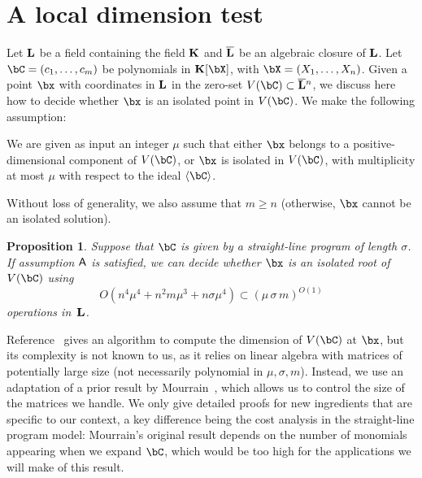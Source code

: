 \documentclass[12pt]{article}
\newtheorem{proposition}[definition]{Proposition}
\begin{document}


\section{A local dimension test} \label{sec:isolated}

Let $\mathbf{L}$ be a field containing the field $\mathbf{K}$ and $\overline{\mathbf{L}}$ be an
algebraic closure of $\mathbf{L}$.  Let $\bC=(c_1,\dots,c_m)$ be polynomials
in $\KK[\bX]$, with $\bX=(X_1,\dots,X_n)$. Given a point $\bx$ with
coordinates in $\mathbf{L}$ in the zero-set $V(\bC)\subset \LLbar{}^n$, we
discuss here how to decide whether $\bx$ is an isolated point in
$V(\bC)$. We make the following assumption:
\begin{description}[leftmargin=*]
\item [$\assH.$] We are given as input an integer $\mu$ such that
 either $\bx$ belongs to a positive-dimensional component of $V(\bC)$,
 or $\bx$ is isolated in $V(\bC)$, with multiplicity at most $\mu$
  with respect to the ideal $\langle \bC\rangle$.
\end{description}
Without loss of generality, we also assume that $m\ge n$ (otherwise, $\bx$
cannot be an isolated solution). 
\begin{proposition}\label{prop:testisolated}
  Suppose that $\bC$ is given by a straight-line program of length $\sigma$.
  If assumption $\mathsf{A}$ is satisfied, we can decide whether $\bx$ is an
  isolated root of $V(\bC)$ using 
$$O(n^4 \mu^4 + n^2 m \mu^3 + n \sigma \mu^4) \subset (\mu\,\sigma\,m)^{O(1)}$$ operations in~$\mathbf{L}$.
\end{proposition}
Reference~\cite{BaHaPeSo09} gives an algorithm to compute the
dimension of $V(\bC)$ at $\bx$, but its complexity is not known to us,
as it relies on linear algebra with matrices of potentially large size
(not necessarily polynomial in $\mu,\sigma,m$).  Instead, we use an
adaptation of a prior result by Mourrain~\cite{Mourrain97}, which
allows us to control the size of the matrices we handle. We only give
detailed proofs for new ingredients that are specific to our context,
a key difference being the cost analysis in the straight-line program
model: Mourrain's original result depends on the number of monomials
appearing when we expand $\bC$, which would be too high for the
applications we will make of this result.
\end{document}
